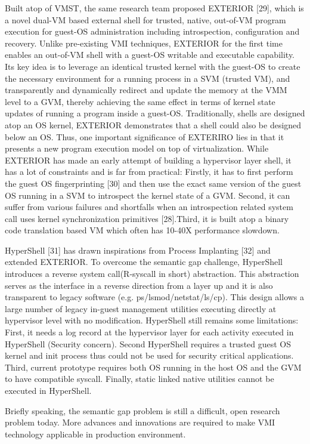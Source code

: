 Built atop of VMST, the same research team proposed EXTERIOR [29], which is a novel dual-VM based external shell for trusted, native, out-of-VM program execution for guest-OS administration including introspection, configuration and recovery. Unlike pre-existing VMI techniques, EXTERIOR for the first time enables an out-of-VM shell with a guest-OS writable and executable capability. Its key idea is to leverage an identical trusted kernel with the guest-OS to create the necessary environment for a running process in a SVM (trusted VM), and transparently and dynamically redirect and update the memory at the VMM level to a GVM, thereby achieving the same effect in terms of kernel state updates of running a program inside a guest-OS. Traditionally, shells are designed atop an OS kernel, EXTERIOR demonstrates that a shell could also be designed below an OS. Thus, one important significance of EXTERIRO lies in that it presents a new program execution model on top of virtualization. While EXTERIOR has made an early attempt of building a hypervisor layer shell, it has a lot of constraints and is far from practical: Firstly, it has to first perform the guest OS fingerprinting [30] and then use the exact same version of the guest OS running in a SVM to introspect the kernel state of a GVM. Second, it can suffer from various failures and shortfalls when an introspection related system call uses kernel synchronization primitives [28].Third, it is built atop a binary code translation based VM which often has 10-40X performance slowdown. 

HyperShell [31] has drawn inspirations from Process Implanting [32] and extended EXTERIOR. To overcome the semantic gap challenge, HyperShell introduces a reverse system call(R-syscall in short) abstraction. This abstraction serves as the interface in a reverse direction from a layer up and it is also transparent to legacy software (e.g. ps/lsmod/netstat/ls/cp). This design allows a large number of legacy in-guest management utilities executing directly at hypervisor level with no modification. HyperShell still remains some limitations: First, it needs a log record at the hypervisor layer for each activity executed in HyperShell (Security concern). Second HyperShell requires a trusted guest OS kernel and init process thus could not be used for security critical applications. Third, current prototype requires both OS running in the host OS and the GVM to have compatible syscall. Finally, static linked native utilities cannot be executed in HyperShell.

Briefly speaking, the semantic gap problem is still a difficult, open research problem today. More advances and innovations are required to make VMI technology applicable in production environment.



